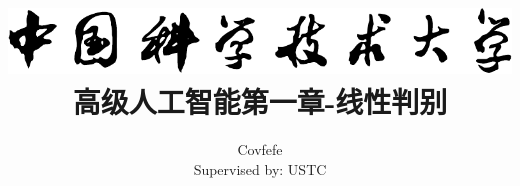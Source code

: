 \usepackage[utf8]{inputenc}
\usepackage{graphicx}
\usepackage[a4paper,width=150mm,top=25mm,bottom=25mm]{geometry}
\usepackage[UTF8]{ctex}
\usepackage{xcolor}  
\usepackage{tikz}
\usepackage{pst-blur}
\usepackage{pstricks-add}
\usepackage{unicode-math}
\usepackage[ruled,linesnumbered]{algorithm2e}
\usepackage{enumitem}
\usetikzlibrary{arrows,shapes,chains}
\usepackage{titlesec}
\titlespacing{\subsubsection}{0pt}{9pt}{-30pt}
\usepackage{hyperref}

\newcommand{\firstchapterurl}{}

\graphicspath{{figures/}}

\title{
    {\includegraphics[]{logo.pdf}}\\
    {高级人工智能第一章-线性判别}
}


\author{Covfefe \\ Supervised by: USTC}



